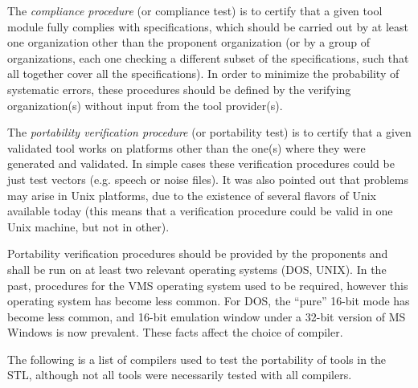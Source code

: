 The {\em compliance procedure} (or compliance test) is to certify that
a given tool module fully complies with specifications, which should
be carried out by at least one organization other than the proponent
organization (or by a group of organizations, each one checking a
different subset of the specifications, such that all together cover
all the specifications). In order to minimize the probability of
systematic errors, these procedures should be defined by the verifying
organization(s) without input from the tool provider(s).

The {\em portability verification procedure} (or portability test) is
to certify that a given validated tool works on platforms other than
the one(s) where they were generated and validated.  In simple cases
these verification procedures could be just test vectors (e.g. speech
or noise files). It was also pointed out that problems may arise in
Unix platforms, due to the existence of several flavors of Unix
available today (this means that a verification procedure could be
valid in one Unix machine, but not in other).

Portability verification procedures should be provided by the
proponents and shall be run on at least two relevant operating systems
(DOS, UNIX). In the past, procedures for the VMS operating system used
to be required, however this operating system has become less
common. For DOS, the ``pure'' 16-bit mode has become less common, and
16-bit emulation window under a 32-bit version of MS Windows is now
prevalent. These facts affect the choice of compiler.

The following is a list of compilers used to test the portability of
tools in the STL, although not all tools were necessarily tested with
all compilers.


